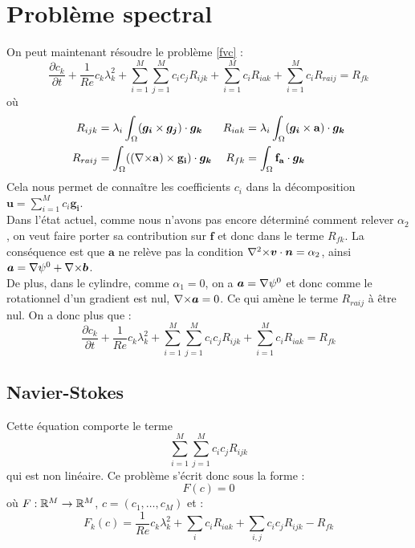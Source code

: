 \chapter{Problème spectral}
On peut maintenant résoudre le problème \ref{fvc} :
\[ \frac{\partial c_k}{\partial t} + \frac{1}{Re}c_k\lambda_k^2 + \sum_{i=1}^M\sum_{j=1}^Mc_ic_jR_{ijk} + \sum_{i=1}^Mc_iR_{iak} + \sum_{i=1}^Mc_iR_{raij} = R_{fk} \]
où
\begin{align*}
R_{ijk} &= \lambda_i\int_\Omega(\bm{g_i}\times \bm{g_j})\cdot\bm{g_k} & R_{iak} &= \lambda_i\int_\Omega(\bm{g_i}\times \mathbf{a})\cdot\bm{g_k}\\
R_{raij} &= \int_\Omega(({\nabla\times}\mathbf{a})\times \mathbf{g_i})\cdot\bm{g_k} & R_{fk} &= \int_\Omega\mathbf{f_a}\cdot\bm{g_k}
\end{align*}
Cela nous permet de connaître les coefficients $c_i$ dans la décomposition $\bm{u}=\sum_{i=1}^M c_i\bm{g_i}$.\\

Dans l'état actuel, comme nous n'avons pas encore déterminé comment relever $\alpha_2$, on veut faire porter sa contribution sur $\bm{f}$ et donc dans le terme $R_{fk}$. La conséquence est que $\bm{a}$ ne relève pas la condition ${\nabla^2\times}\bm{v}\cdot\bm{n}=\alpha_2$, ainsi $\bm{a}={\nabla}\psi^0+{\nabla\times}\bm{b}$.\\

De plus, dans le cylindre, comme $\alpha_1=0$, on a $\bm{a}={\nabla}\psi^0$ et donc comme le rotationnel d'un gradient est nul, ${\nabla\times} \bm{a} = 0$. Ce qui amène le terme $R_{raij}$ à être nul. On a donc plus que :
\[ \frac{\partial c_k}{\partial t} + \frac{1}{Re}c_k\lambda_k^2 + \sum_{i=1}^M\sum_{j=1}^Mc_ic_jR_{ijk} + \sum_{i=1}^Mc_iR_{iak} = R_{fk} \]

\section{Navier-Stokes}
\label{PSNewton}
Cette équation comporte le terme
\[ \sum_{i=1}^M\sum_{j=1}^M c_i c_jR_{ijk} \]
qui est non linéaire. Ce problème s'écrit donc sous la forme :
\[ F(c) = 0 \]
où $F:{\mathbb{R}}^M\rightarrow{\mathbb{R}}^M$, $c=(c_1,\ldots, c_M)$ et :
\begin{equation}\label{psf}
 F_k(c) = \frac{1}{Re} c_k\lambda_k^2 + \sum_i c_i R_{iak} + \sum_{i,j} c_i c_j R_{ijk} - R_{fk}
\end{equation}


